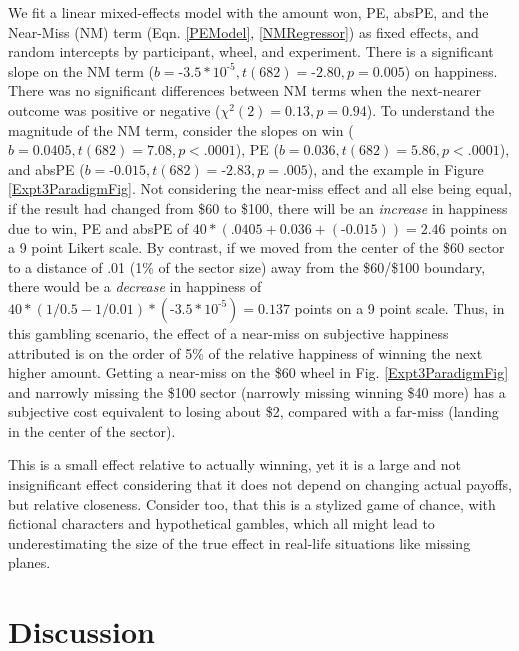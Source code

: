 \documentclass[10pt,letterpaper]{article}
\newcommand{\red}[1]{\textcolor{Red}{#1}}
\begin{document}
We fit a linear mixed-effects model with the amount won, PE, absPE, and the Near-Miss (NM) term (Eqn. \ref{PEModel}, \ref{NMRegressor}) as fixed effects, and random intercepts by participant, wheel, and experiment. There is a significant slope on the NM term ($b = \text{-}3.5 * 10^{\text{-}5}, t(682)=\text{-}2.80, p=0.005$) on happiness. There was no significant differences between NM terms when the next-nearer outcome was positive or negative ($\chi^2(2)=0.13, p=0.94$). To understand the magnitude of the NM term, consider the slopes on win ($b = 0.0405, t(682) = 7.08, p<.0001$), PE ($b=0.036, t(682)=5.86, p<.0001$), and absPE ($b=\text{-}0.015, t(682) = \text{-}2.83, p=.005$), and the example in Figure \ref{Expt3ParadigmFig}. Not considering the near-miss effect and all else being equal, if the result had changed from \$60 to \$100, there will be an \textit{increase} in happiness due to win, PE and absPE of $40*(.0405+0.036+(\text{-}0.015)) = 2.46$ points on a 9 point Likert scale. By contrast, if we moved from the center of the \$60 sector to a distance of .01 (1\% of the sector size) away from the \$60/\$100 boundary, there would be a \textit{decrease} in happiness of $40*(1/0.5 - 1/0.01)*(\text{-}3.5 * 10^{\text{-}5}) = 0.137$ points on a 9 point scale. Thus, in this gambling scenario, the effect of a near-miss on subjective happiness attributed is on the order of 5\% of the relative happiness of winning the next higher amount. Getting a near-miss on the \$60 wheel in Fig. \ref{Expt3ParadigmFig} and narrowly missing the \$100 sector (narrowly missing winning \$40 more) has a subjective cost equivalent to losing about \$2, compared with a far-miss (landing in the center of the sector). 

This is a small effect relative to actually winning, yet it is a large and not insignificant effect considering that it does not depend on changing actual payoffs, but relative closeness. Consider too, that this is a stylized game of chance, with fictional characters and hypothetical gambles, which all might lead to underestimating the size of the true effect in real-life situations like missing planes.


\section{Discussion}
\end{document}
